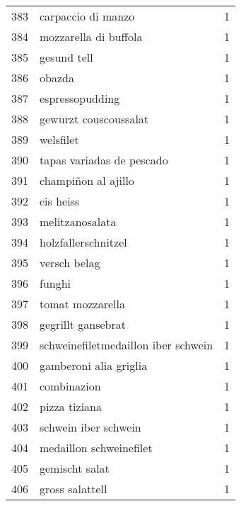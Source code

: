 \begin{tabular}{llr}
383 &                                 carpaccio di manzo &      1 \\
384 &                              mozzarella di buffola &      1 \\
385 &                                        gesund tell &      1 \\
386 &                                             obazda &      1 \\
387 &                                    espressopudding &      1 \\
388 &                              gewurzt couscoussalat &      1 \\
389 &                                          welsfilet &      1 \\
390 &                          tapas variadas de pescado &      1 \\
391 &                                champiñon al ajillo &      1 \\
392 &                                          eis heiss &      1 \\
393 &                                    melitzanosalata &      1 \\
394 &                                holzfallerschnitzel &      1 \\
395 &                                       versch belag &      1 \\
396 &                                             funghi &      1 \\
397 &                                   tomat mozzarella &      1 \\
398 &                                 gegrillt gansebrat &      1 \\
399 &                schweinefiletmedaillon iber schwein &      1 \\
400 &                             gamberoni alia griglia &      1 \\
401 &                                        combinazion &      1 \\
402 &                                      pizza tiziana &      1 \\
403 &                               schwein iber schwein &      1 \\
404 &                            medaillon schweinefilet &      1 \\
405 &                                     gemischt salat &      1 \\
406 &                                    gross salattell &      1 \\

\end{tabular}

